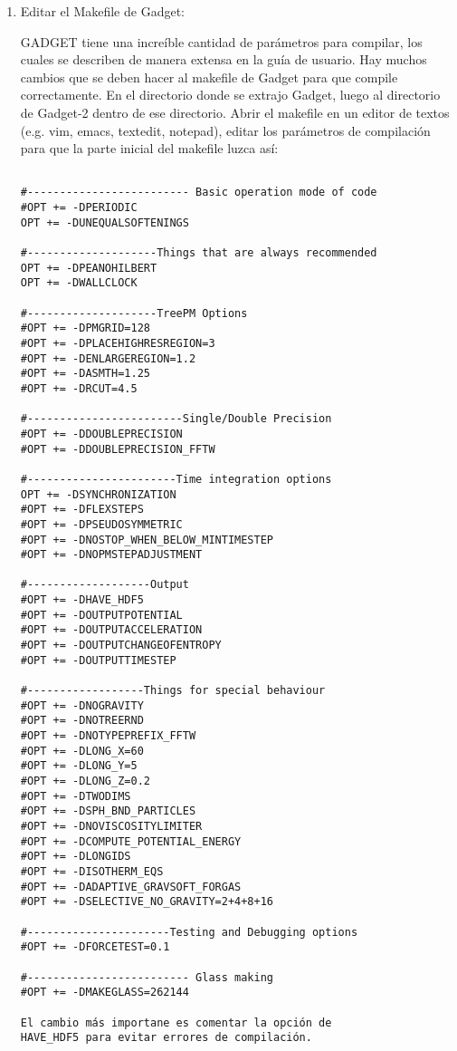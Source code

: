 \documentclass[a4paper,openright,10pt, oneside, final]{book}
\begin{document}
\begin{enumerate}
\item Editar el \textsf{Makefile} de Gadget:

GADGET tiene una increíble cantidad de parámetros para compilar, los cuales se describen de manera extensa en la guía de usuario. Hay muchos cambios que se deben hacer al \textsf{makefile} de Gadget para que compile correctamente.  En el directorio donde se extrajo Gadget, luego al directorio de \textsf{Gadget-2} dentro de ese directorio. Abrir el \textsf{makefile} en un editor de textos (e.g. \textsf{vim, emacs, textedit, notepad}), editar los parámetros de compilación para que la parte inicial del \textsf{makefile} luzca así:
\begin{verbatim}

#------------------------- Basic operation mode of code
#OPT += -DPERIODIC
OPT += -DUNEQUALSOFTENINGS

#--------------------Things that are always recommended
OPT += -DPEANOHILBERT
OPT += -DWALLCLOCK

#--------------------TreePM Options
#OPT += -DPMGRID=128
#OPT += -DPLACEHIGHRESREGION=3
#OPT += -DENLARGEREGION=1.2
#OPT += -DASMTH=1.25
#OPT += -DRCUT=4.5

#------------------------Single/Double Precision
#OPT += -DDOUBLEPRECISION
#OPT += -DDOUBLEPRECISION_FFTW

#-----------------------Time integration options
OPT += -DSYNCHRONIZATION
#OPT += -DFLEXSTEPS
#OPT += -DPSEUDOSYMMETRIC
#OPT += -DNOSTOP_WHEN_BELOW_MINTIMESTEP
#OPT += -DNOPMSTEPADJUSTMENT

#-------------------Output
#OPT += -DHAVE_HDF5
#OPT += -DOUTPUTPOTENTIAL
#OPT += -DOUTPUTACCELERATION
#OPT += -DOUTPUTCHANGEOFENTROPY
#OPT += -DOUTPUTTIMESTEP

#------------------Things for special behaviour
#OPT += -DNOGRAVITY
#OPT += -DNOTREERND
#OPT += -DNOTYPEPREFIX_FFTW
#OPT += -DLONG_X=60
#OPT += -DLONG_Y=5
#OPT += -DLONG_Z=0.2
#OPT += -DTWODIMS
#OPT += -DSPH_BND_PARTICLES
#OPT += -DNOVISCOSITYLIMITER
#OPT += -DCOMPUTE_POTENTIAL_ENERGY
#OPT += -DLONGIDS
#OPT += -DISOTHERM_EQS
#OPT += -DADAPTIVE_GRAVSOFT_FORGAS
#OPT += -DSELECTIVE_NO_GRAVITY=2+4+8+16

#----------------------Testing and Debugging options
#OPT += -DFORCETEST=0.1

#------------------------- Glass making
#OPT += -DMAKEGLASS=262144

El cambio más importane es comentar la opción de
HAVE_HDF5 para evitar errores de compilación.


\end{verbatim}
\end{enumerate}
\end{document}
